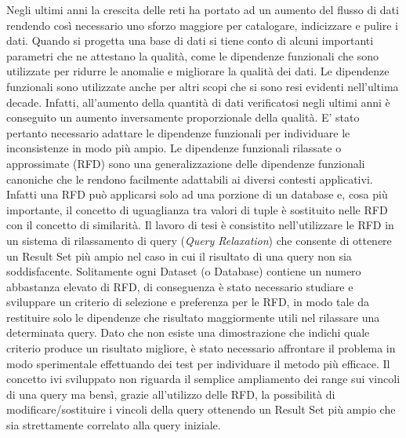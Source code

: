 Negli ultimi anni la crescita delle reti ha portato ad un aumento del flusso di dati rendendo così necessario uno sforzo maggiore per catalogare, indicizzare e pulire i dati. 
Quando si progetta una base di dati si tiene conto di alcuni importanti parametri che ne attestano la qualità, come le dipendenze funzionali che sono utilizzate per ridurre le anomalie e migliorare la qualità dei dati.
Le dipendenze funzionali sono utilizzate anche per altri scopi che si sono resi evidenti nell’ultima decade. Infatti,  all’aumento della quantità di dati verificatosi negli ultimi anni è conseguito un aumento inversamente proporzionale della qualità. E' stato pertanto necessario adattare le dipendenze funzionali per individuare le inconsistenze in modo più ampio.
Le dipendenze funzionali rilassate o approssimate (RFD) sono una generalizzazione delle dipendenze funzionali canoniche che le rendono facilmente adattabili ai diversi contesti applicativi. Infatti una RFD può applicarsi solo ad una porzione di un database e, cosa più importante, il concetto di uguaglianza tra valori di tuple è sostituito nelle RFD  con il concetto di similarità. 
Il lavoro di tesi è consistito nell’utilizzare le RFD in un sistema di rilassamento di query (\emph{Query Relaxation}) che consente di ottenere un Result Set più ampio nel caso in cui il risultato di una query non sia soddisfacente. Solitamente ogni Dataset (o Database) contiene un numero abbastanza elevato di RFD, di conseguenza è stato necessario studiare e sviluppare un criterio di selezione e preferenza per le RFD, in modo tale da restituire solo le dipendenze che risultato maggiormente utili nel rilassare una determinata query. Dato che non esiste una dimostrazione che indichi quale criterio produce un risultato migliore, è stato necessario affrontare il problema in modo sperimentale effettuando dei test per individuare il metodo più efficace.
Il concetto ivi sviluppato non riguarda il semplice ampliamento dei range sui vincoli di una query ma bensì, grazie all'utilizzo delle RFD, la possibilità di modificare/sostituire i vincoli della query ottenendo un Result Set più ampio che sia strettamente correlato alla query iniziale.